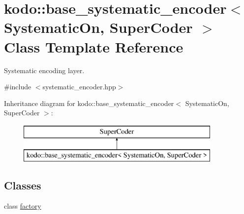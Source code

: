\hypertarget{classkodo_1_1base__systematic__encoder}{\section{kodo\-:\-:base\-\_\-systematic\-\_\-encoder$<$ Systematic\-On, Super\-Coder $>$ Class Template Reference}
\label{classkodo_1_1base__systematic__encoder}
}


Systematic encoding layer.  




{\ttfamily \#include $<$systematic\-\_\-encoder.\-hpp$>$}

Inheritance diagram for kodo\-:\-:base\-\_\-systematic\-\_\-encoder$<$ Systematic\-On, Super\-Coder $>$\-:\begin{figure}[H]
\begin{center}
\leavevmode
\includegraphics[height=2.000000cm]{classkodo_1_1base__systematic__encoder}
\end{center}
\end{figure}
\subsection*{Classes}
\begin{DoxyCompactItemize}
\item 
class \hyperlink{classkodo_1_1base__systematic__encoder_1_1factory}{factory}
\end{DoxyCompactItemize}
